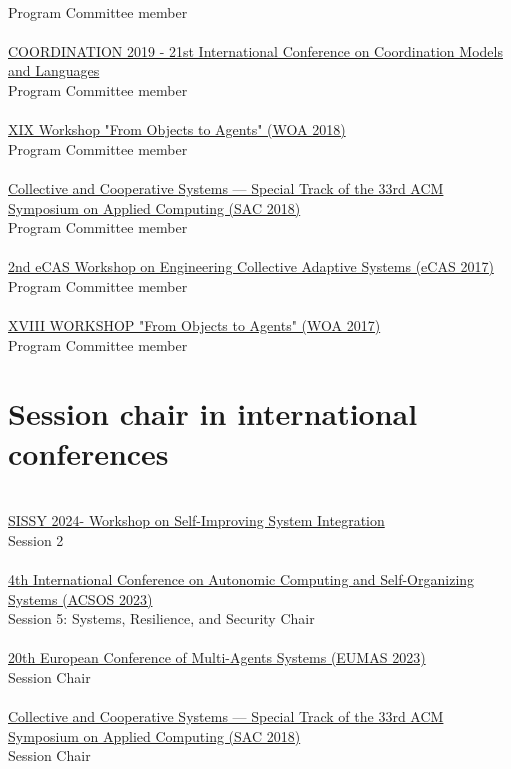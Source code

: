 \\ Program Committee member \\
\halfblankline \\
\href{http://www.discotec.org/2019/coordination}{COORDINATION 2019 - 21st International Conference on Coordination Models and Languages}
\\ Program Committee member \\
\halfblankline \\
\href{http://diid.unipa.it/roboticslab/woa2018/}{XIX Workshop "From Objects to Agents" (WOA 2018)}
\\ Program Committee member \\
\halfblankline \\
\href{http://sac-cas2018.apice.unibo.it/referees.html}{Collective and Cooperative Systems --- Special Track of the 33rd ACM Symposium on Applied Computing (SAC 2018)}
\\ Program Committee member \\
\halfblankline \\
\href{http://apice.unibo.it/xwiki/bin/view/ECAS2017/WebHome}{2nd eCAS Workshop on Engineering Collective Adaptive Systems (eCAS 2017)}
\\ Program Committee member \\
\halfblankline \\
\href{http://woa2017.unirc.it/}{XVIII WORKSHOP "From Objects to Agents" (WOA 2017)}
\\ Program Committee member \\

\section{{\color{black}Session chair in international conferences}}
\halfblankline \\
\href{https://2024.acsos.org/track/acsos-2024-workshops#sissy}{SISSY 2024- Workshop on Self-Improving System Integration}
\\ Session 2 \\
\halfblankline \\
\href{https://conf.researchr.org/home/acsos-2023/}{4th International Conference on Autonomic Computing and Self-Organizing Systems (ACSOS 2023)}
\\ Session 5: Systems, Resilience, and Security Chair \\
\halfblankline \\
\href{https://eumas23.github.io/home/}{20th European Conference of Multi-Agents Systems (EUMAS 2023)}
\\ Session Chair \\
\halfblankline \\
\href{http://sac-cas2018.apice.unibo.it/referees.html}{Collective and Cooperative Systems --- Special Track of the 33rd ACM Symposium on Applied Computing (SAC 2018)}
\\ Session Chair \\
